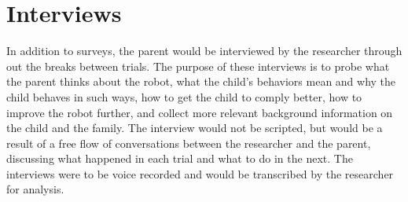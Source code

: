 \section{Interviews}
In addition to surveys, the parent would be interviewed by the researcher through out the breaks between trials.  The purpose of these interviews is to probe what the parent thinks about the robot, what the child's behaviors mean and why the child behaves in such ways, how to get the child to comply better, how to improve the robot further, and collect more relevant background information on the child and the family.  The interview would not be scripted, but would be a result of a free flow of conversations between the researcher and the parent, discussing what happened in each trial and what to do in the next.  The interviews were to be voice recorded and would be transcribed by the researcher for analysis.

